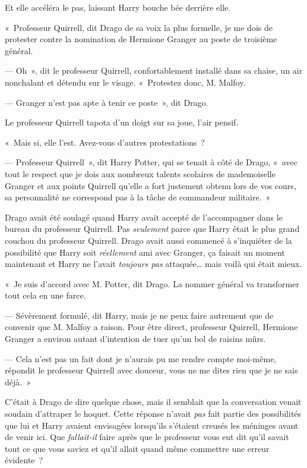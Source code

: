 Et elle accéléra le pas, laissant Harry bouche bée derrière elle.

\later

«~Professeur Quirrell, dit Drago de sa voix la plus formelle, je me dois de protester contre la nomination de Hermione Granger au poste de troisième général.

--- Oh~», dit le professeur Quirrell, confortablement installé dans sa chaise, un air nonchalant et détendu sur le visage.
«~Protestez donc, M. Malfoy.

--- Granger n'est pas apte à tenir ce poste~», dit Drago.

Le professeur Quirrell tapota d'un doigt sur sa joue, l'air pensif.

«~Mais si, elle l'est.
Avez-vous d'autres protestations~?

--- Professeur Quirrell~», dit Harry Potter, qui se tenait à côté de Drago, «~avec tout le respect que je dois aux nombreux talents scolaires de mademoiselle Granger et aux points Quirrell qu'elle a fort justement obtenu lors de vos cours, sa personnalité ne correspond pas à la tâche de commandeur militaire.~»

Drago avait été soulagé quand Harry avait accepté de l'accompagner dans le bureau du professeur Quirrell.
Pas \emph{seulement} parce que Harry était le plus grand couchou du professeur Quirrell.
Drago avait aussi commencé à s'inquiéter de la possibilité que Harry soit \emph{réellement} ami avec Granger, ça faisait un moment maintenant et Harry ne l'avait \emph{toujours pas} attaquée… mais voilà qui était mieux.

«~Je suis d'accord avec M. Potter, dit Drago.
La nommer général va transformer tout cela en une farce.

--- Sévèrement formulé, dit Harry, mais je ne peux faire autrement que de convenir que M. Malfoy a raison.
Pour être direct, professeur Quirrell, Hermione Granger a environ autant d'intention de tuer qu'un bol de raisins mûrs.

--- Cela n'est pas un fait dont je n'aurais pu me rendre compte moi-même, répondit le professeur Quirrell avec douceur, vous ne me dites rien que je ne sais déjà.~»

C'était à Drago de dire quelque chose, mais il semblait que la conversation venait soudain d'attraper le hoquet.
Cette réponse n'avait \emph{pas} fait partie des possibilités que lui et Harry avaient envisagées lorsqu'ils s'étaient creusés les méninges avant de venir ici.
Que \emph{fallait-il} faire après que le professeur vous eut dit qu'il savait tout ce que vous saviez et qu'il allait quand même commettre une erreur évidente~?

